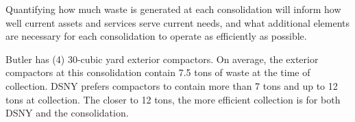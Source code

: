 
    Quantifying how much waste is generated at each consolidation will inform how well current assets and services serve current needs, and what additional elements are necessary for each consolidation to operate as efficiently as possible.
    
    Butler has (4) 30-cubic yard exterior compactors. On average, the exterior compactors at this consolidation contain 7.5 tons of waste at the time of collection. DSNY prefers compactors to contain more than 7 tons and up to 12 tons at collection. The closer to 12 tons, the more efficient collection is for both DSNY and the consolidation.